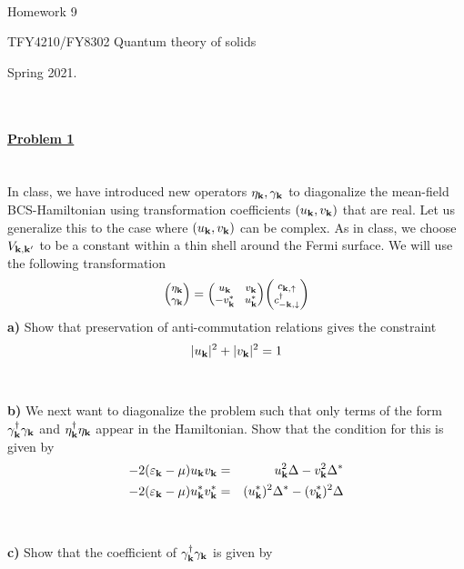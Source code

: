 \documentclass{article}
\newenvironment{mpmatrix}{\begin{medsize}\begin{pmatrix}}%
    {\end{pmatrix}\end{medsize}}%
\begin{document}
\\

\centerline{\Large Homework 9}
\centerline{\Large  TFY4210/FY8302 Quantum theory of solids}
\centerline{\Large Spring 2021.}
\normalsize
\ \\
\ \\
\underline{\large\bf Problem 1 }\\
\ \\
\ \\
In class, we have introduced new operators $\eta_{\bf k}, \gamma_{\bf k}$ to diagonalize the mean-field BCS-Hamiltonian using transformation coefficients $(u_{\bf k}, v_{\bf k})$ that are real. Let us generalize this to the case where $(u_{\bf k}, v_{\bf k})$  can be complex. As in class, we choose $V_{{\bf k},{\bf k}^{\prime}}$ to be a constant within a thin shell around the Fermi surface. We will use the following transformation
\[
 \begin{mpmatrix}
    \eta_{ \bf k } \\
    \gamma_{ \bf k }
    \end{mpmatrix} 
=
    \begin{mpmatrix}
    u_{\bf k} & v_{\bf k} \\
    - v^{*}_{\bf k} & u^{*}_{\bf k}
    \end{mpmatrix} 
     \begin{mpmatrix}
    c_{{\bf k}, \uparrow}\\
    c^{\dagger}_{-{\bf k},\downarrow} 
    \end{mpmatrix} 
 \]
{\bf a)} Show that preservation of anti-commutation relations gives the constraint 
$$|u_{\bf k}|^2+|v_{\bf k}|^2=1 $$
\ \\
\ \\
{\bf b)} We next want to diagonalize the problem such that only terms of the form $ \gamma^{\dagger}_{\bf k }  \gamma_{\bf k }$ 
and  $ \eta^{\dagger}_{\bf k }  \eta_{\bf k }$ appear in the Hamiltonian. Show that the condition for this is given by
\begin{eqnarray}
-2 (\varepsilon_{\bf k} - \mu) u_{\bf k} v_{\bf k} & = & u_{\bf k}^2 \Delta - v_{\bf k}^2 \Delta^{*}  \nonumber \\
-2 (\varepsilon_{\bf k} - \mu) u^{*}_{\bf k}  v^{*}_{\bf k} & = & (u^{*}_{\bf k})^2 \Delta^{*} - (v^{*}_{\bf k})^2 \Delta  \nonumber 
\end{eqnarray}
\ \\
\ \\
{\bf c)} Show that the coefficient of $\gamma^{\dagger}_{ \bf k }  \gamma_{\bf k }$ is given by
\end{document}
